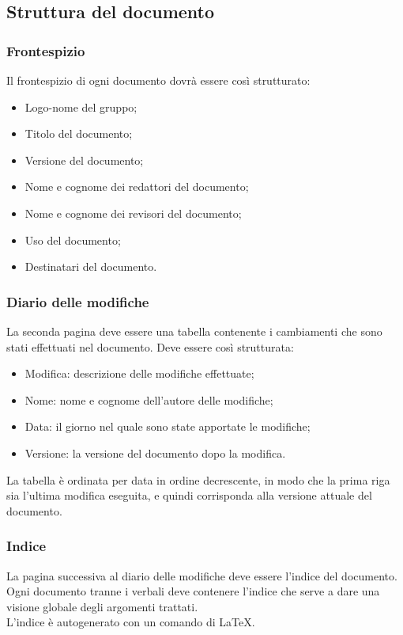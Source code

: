 \documentclass[12pt,a4paper,titlepage]{article}
\begin{document}
\subsection{Struttura del documento}
\subsubsection{Frontespizio}
Il frontespizio di ogni documento dovrà essere così strutturato:
\begin{itemize}
	\item Logo-nome del gruppo;
	\item Titolo del documento;
	\item Versione del documento;
	\item Nome e cognome dei redattori del documento;
	\item Nome e cognome dei revisori del documento;
	\item Uso del documento;
	\item Destinatari del documento.
\end{itemize}
\subsubsection{Diario delle modifiche}
La seconda pagina deve essere una tabella contenente i cambiamenti che sono stati 
effettuati nel documento. Deve essere così strutturata:
\begin{itemize}
	\item Modifica: descrizione delle modifiche effettuate;
	\item Nome: nome e cognome dell'autore delle modifiche;
	\item Data: il giorno nel quale sono state apportate le modifiche;
	\item Versione: la versione del documento dopo la modifica.
\end{itemize}
La tabella è ordinata per data in ordine decrescente, in modo che la prima riga 
sia l'ultima modifica eseguita, e quindi corrisponda alla versione attuale del documento.
\subsubsection{Indice}
La pagina successiva al diario delle modifiche deve essere l'indice del documento.
Ogni documento tranne i verbali deve contenere l'indice che serve a dare una visione globale degli argomenti trattati.\\
L'indice è autogenerato con un comando di \LaTeX .
\end{document}
